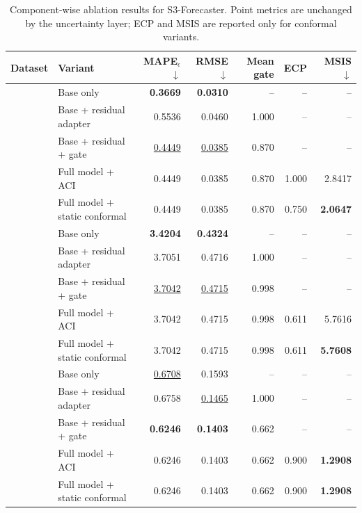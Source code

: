 \begin{table}[!htbp]
\centering
\caption{Component-wise ablation results for S3-Forecaster. Point metrics are unchanged by the uncertainty layer; ECP and MSIS are reported only for conformal variants.}
\label{tab:s3_ablation_vertical}
\scriptsize
\setlength{\tabcolsep}{3pt}
\renewcommand{\arraystretch}{0.9999}
\begin{tabular}{|>{\centering\arraybackslash}p{1.45cm}|l|r|r|r|r|r|}
\hline
Dataset & Variant & MAPE$_\epsilon$ $\downarrow$ & RMSE $\downarrow$ & Mean gate & ECP & MSIS $\downarrow$ \\
\hline
\multirow{5}{=}{\centering CIF} & Base only & \textbf{0.3669} & \textbf{0.0310} & -- & -- & -- \\
\cline{2-7}
 & Base + residual adapter & 0.5536 & 0.0460 & 1.000 & -- & -- \\
\cline{2-7}
 & Base + residual + gate & \underline{0.4449} & \underline{0.0385} & 0.870 & -- & -- \\
\cline{2-7}
 & Full model + ACI & 0.4449 & 0.0385 & 0.870 & 1.000 & 2.8417 \\
\cline{2-7}
 & Full model + static conformal & 0.4449 & 0.0385 & 0.870 & 0.750 & \textbf{2.0647} \\
\hline
\multirow{5}{=}{\centering M3} & Base only & \textbf{3.4204} & \textbf{0.4324} & -- & -- & -- \\
\cline{2-7}
 & Base + residual adapter & 3.7051 & 0.4716 & 1.000 & -- & -- \\
\cline{2-7}
 & Base + residual + gate & \underline{3.7042} & \underline{0.4715} & 0.998 & -- & -- \\
\cline{2-7}
 & Full model + ACI & 3.7042 & 0.4715 & 0.998 & 0.611 & 5.7616 \\
\cline{2-7}
 & Full model + static conformal & 3.7042 & 0.4715 & 0.998 & 0.611 & \textbf{5.7608} \\
\hline
\multirow{5}{=}{\centering ICMD} & Base only & \underline{0.6708} & 0.1593 & -- & -- & -- \\
\cline{2-7}
 & Base + residual adapter & 0.6758 & \underline{0.1465} & 1.000 & -- & -- \\
\cline{2-7}
 & Base + residual + gate & \textbf{0.6246} & \textbf{0.1403} & 0.662 & -- & -- \\
\cline{2-7}
 & Full model + ACI & 0.6246 & 0.1403 & 0.662 & 0.900 & \textbf{1.2908} \\
\cline{2-7}
 & Full model + static conformal & 0.6246 & 0.1403 & 0.662 & 0.900 & \textbf{1.2908} \\

\end{tabular}
\end{table}
